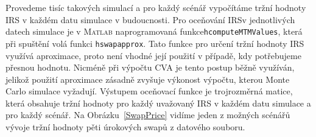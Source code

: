 \documentclass[a4paper,12pt]{report}
\theoremstyle{definition} \newtheorem{definice}[veta]{Definice}
\theoremstyle{remark}
\newcommand{\MATLAB}{\textsc{Matlab}\xspace}
\begin{document}
Provedeme tisíc takových simulací 
a pro každý scénář vypočítáme tržní hodnoty IRS v každém datu simulace v budoucnosti.
Pro oceňování IRS\linebreak v jednotlivých datech simulace je v \MATLAB naprogramovaná funkce\linebreak \verb+hcomputeMTMValues+, která při spuštění volá funkci \verb+hswapapprox+. 
Tato funkce pro určení tržní hodnoty IRS využívá aproximace, proto není vhodné její použití v případě, kdy potřebujeme přesnou hodnotu.  
Nicméně při výpočtu CVA je tento postup běžně využíván, jelikož použití aproximace zásadně zvyšuje výkonost výpočtu, kterou  Monte Carlo simulace vyžadují.  
Výstupem oceňovací funkce je trojrozměrná matice, která obsahuje tržní hodnoty pro každý uvažovaný IRS v každém datu simulace a pro každý scénář. 
Na Obrázku~\ref{SwapPrice} vidíme jeden z možných scénářů vývoje tržní hodnoty pěti úrokových swapů z datového souboru.
\end{document}
